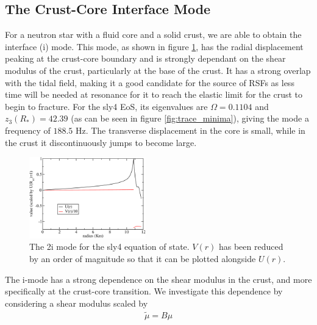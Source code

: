 \documentclass[fleqn,usenatbib]{mnras}
\begin{document}
\subsection{The Crust-Core Interface Mode}
\hspace{\parindent}For a neutron star with a fluid core and a solid crust, we are able to obtain the interface (i) mode. This mode, as shown in figure \ref{fig:imode_sly4}, has the radial displacement peaking at the crust-core boundary and is strongly dependant on the shear modulus of the crust, particularly at the base of the crust. It has a strong overlap with the tidal field, making it a good candidate for the source of RSFs as less time will be needed at resonance for it to reach the elastic limit for the crust to begin to fracture. For the sly4 EoS, its eigenvalues are $\Omega=0.1104$ and $z_3(R_*)=42.39$ (as can be seen in figure \ref{fig:trace_minima}), giving the mode a frequency of $188.5$ Hz. The transverse displacement in the core is small, while in the crust it discontinuously jumps to become large.

\begin{figure}
\centering
\includegraphics[width=0.45\textwidth,angle=0]{sly4_imode}
\caption{The 2i mode for the sly4 equation of state. $V(r)$ has been reduced by an order of magnitude so that it can be plotted alongside $U(r)$.}
\label{fig:imode_sly4}
\end{figure}

\hspace{\parindent}The i-mode has a strong dependence on the shear modulus in the crust, and more specifically at the crust-core transition. We investigate this dependence by considering a shear modulus scaled by 
\begin{align}
\tilde{\mu} = B \mu 
\end{align}
\end{document}

